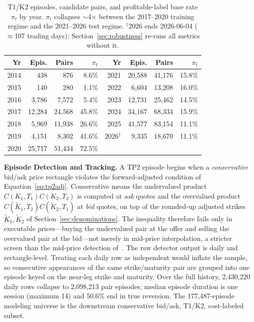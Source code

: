 \documentclass[sigconf,review]{acmart}
\begin{document}
\begin{table}[t]
\centering
\footnotesize
\begin{tabular}{rrrr@{\hskip 1.4em}rrrr}
\toprule
Yr & Epis. & Pairs & $\pi_t$ & Yr & Epis. & Pairs & $\pi_t$ \\
\midrule
2014 & 438 & 876 & 8.6\% & 2021 & 20{,}588 & 41{,}176 & 15.8\% \\
2015 & 140 & 280 & 1.1\% & 2022 & 6{,}604 & 13{,}208 & 16.0\% \\
2016 & 3{,}786 & 7{,}572 & 5.4\% & 2023 & 12{,}731 & 25{,}462 & 14.5\% \\
2017 & 12{,}284 & 24{,}568 & 45.8\% & 2024 & 34{,}167 & 68{,}334 & 15.9\% \\
2018 & 5{,}969 & 11{,}938 & 26.6\% & 2025 & 41{,}577 & 83{,}154 & 11.1\% \\
2019 & 4{,}151 & 8{,}302 & 41.6\% & 2026$^\dagger$ & 9{,}335 & 18{,}670 & 11.1\% \\
2020 & 25{,}717 & 51{,}434 & 72.5\% & & & & \\
\bottomrule
\end{tabular}
\caption{T1/K2 episodes, candidate pairs, and profitable-label base rate $\pi_t$ by year. $\pi_t$ collapses $\sim$4$\times$ between the 2017--2020 training regime and the 2021--2026 test regime. $^\dagger$2026 ends 2026-06-04 ($\approx$107 trading days); Section~\ref{sec:robustness} re-runs all metrics without it.}
\label{tab:peryear}
\end{table}

\medskip\noindent\textbf{Episode Detection and Tracking.}
\label{sec:episode-tracking}
A TP2 episode begins when a \emph{conservative} bid/ask price rectangle violates the forward-adjusted condition of Equation~\eqref{eq:tp2adj}. Conservative means the undervalued product $C(K_1,T_1)C(K_2,T_2)$ is computed at \emph{ask} quotes and the overvalued product $C(\tilde K_1,T_2)C(\tilde K_2,T_1)$ at \emph{bid} quotes, on top of the rounded-up adjusted strikes $\tilde K_1,\tilde K_2$ of Section~\ref{sec:denominations}. The inequality therefore fails only in executable prices---buying the undervalued pair at the offer and selling the overvalued pair at the bid---not merely in mid-price interpolation, a stricter screen than the mid-price detection of~\cite{glasserman2025tp2}. The raw detector output is daily and rectangle-level. Treating each daily row as independent would inflate the sample, so consecutive appearances of the same strike/maturity pair are grouped into one episode keyed on the near-leg strike and maturity. Over the full history, 2{,}430{,}220 daily rows collapse to 2{,}098{,}213 pair episodes; median episode duration is one session (maximum 14) and 50.6\% end in true reversion. The 177{,}487-episode modeling universe is the downstream conservative bid/ask, T1/K2, cost-labeled subset.
\end{document}
